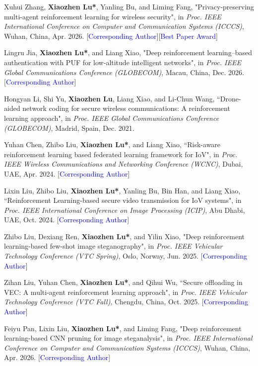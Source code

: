 \documentclass{article}
\begin{document}
\begin{justifying}
\begin{myreferences}
	\item Xuhui Zhang, \textbf{Xiaozhen Lu*}, Yanling Bu, and Liming Fang, "Privacy-preserving multi-agent reinforcement learning for wireless security", in \emph{Proc. IEEE International Conference on Computer and Communication Systems (ICCCS)}, Wuhan, China, Apr. 2026. [\textcolor{blue}{Corresponding Author}][\textcolor{blue}{Best Paper Award}]
	\item Lingru Jia, \textbf{Xiaozhen Lu*}, and Liang Xiao, "Deep reinforcement learning–based authentication with PUF for low‑altitude intelligent networks", in \emph{Proc. IEEE Global Communications Conference (GLOBECOM)}, Macau, China, Dec. 2026. [\textcolor{blue}{Corresponding Author}]
	
	\item Hongyan Li, Shi Yu, \textbf{Xiaozhen Lu}, Liang Xiao, and Li-Chun Wang, ``Drone-aided network coding for secure wireless communications: A reinforcement learning approach", in \emph{Proc. IEEE Global Communications Conference (GLOBECOM)}, Madrid, Spain, Dec. 2021.
	\item Yuhan Chen, Zhibo Liu, \textbf{Xiaozhen Lu*}, and Liang Xiao, ``Risk-aware reinforcement learning based federated learning framework for IoV", in \emph{Proc. IEEE Wireless Communications and Networking Conference (WCNC)}, Dubai, UAE, Apr. 2024. [\textcolor{blue}{Corresponding Author}]
	\item Lixin Liu, Zhibo Liu, \textbf{Xiaozhen Lu*}, Yanling Bu, Bin Han, and Liang Xiao, ``Reinforcement Learning-based secure video transmission for IoV systems", in \emph{Proc. IEEE International Conference on Image Processing (ICIP)}, Abu Dhabi, UAE, Oct. 2024. [\textcolor{blue}{Corresponding Author}]
	\item Zhibo Liu, Dexiang Ren, \textbf{Xiaozhen Lu*}, and Yilin Xiao, "Deep reinforcement learning-based few-shot image steganography", in \emph{Proc. IEEE Vehicular Technology Conference (VTC Spring)}, Oslo, Norway, Jun. 2025. [\textcolor{blue}{Corresponding Author}]
	\item Zihan Liu, Yuhan Chen, \textbf{Xiaozhen Lu*}, and Qihui Wu, ``Secure offloading in VEC: A multi-agent reinforcement learning approach",  in \emph{Proc. IEEE Vehicular Technology Conference (VTC Fall)}, Chengdu, China, Oct. 2025. [\textcolor{blue}{Corresponding Author}]
	\item Feiyu Pan, Lixin Liu, \textbf{Xiaozhen Lu*}, and Liming Fang, "Deep reinforcement learning-based CNN pruning for image steganalysis", in \emph{Proc. IEEE International Conference on Computer and Communication Systems (ICCCS)}, Wuhan, China, Apr. 2026. [\textcolor{blue}{Corresponding Author}]

\end{myreferences}
\end{justifying}
\end{document}
